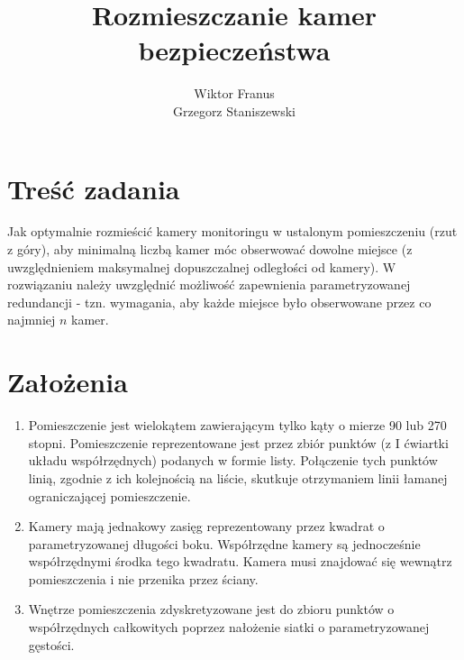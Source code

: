 \documentclass[12pt,a4paper]{article}
\title{Rozmieszczanie kamer bezpieczeństwa}
\author{Wiktor Franus \\ Grzegorz Staniszewski}
\begin{document}
\maketitle
\tableofcontents

\newpage
\section{Treść zadania}
Jak optymalnie rozmieścić kamery monitoringu w ustalonym pomieszczeniu (rzut z góry), aby minimalną liczbą kamer móc obserwować dowolne miejsce (z uwzględnieniem maksymalnej dopuszczalnej odległości od kamery). W rozwiązaniu należy uwzględnić możliwość zapewnienia parametryzowanej redundancji - tzn. wymagania, aby każde miejsce było obserwowane przez co najmniej $n$ kamer.

\section{Założenia}
\begin{enumerate}

\item Pomieszczenie jest wielokątem zawierającym tylko kąty o mierze 90 lub 270 stopni. Pomieszczenie reprezentowane jest przez zbiór punktów (z I ćwiartki układu współrzędnych) podanych w formie listy. Połączenie tych punktów linią, zgodnie z ich kolejnością na liście, skutkuje otrzymaniem linii łamanej ograniczającej pomieszczenie.
\item Kamery mają jednakowy zasięg reprezentowany przez kwadrat o parametryzowanej długości
boku. Współrzędne kamery są jednocześnie współrzędnymi środka tego kwadratu. Kamera musi znajdować się wewnątrz pomieszczenia i nie przenika przez ściany.
\item Wnętrze pomieszczenia zdyskretyzowane jest do zbioru punktów o współrzędnych całkowitych poprzez nałożenie siatki o parametryzowanej gęstości.
\end{enumerate}
\end{document}
